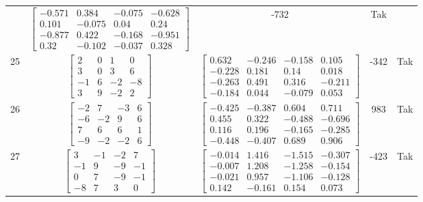 \documentclass[a4paper,12pt]{article}
\begin{document}
\begin{tabular}{c c c c c}
&
$\begin{bmatrix} -0.571 & 0.384 & -0.075 & -0.628 \\ 0.101 & -0.075 & 0.04 & 0.24 \\ -0.877 & 0.422 & -0.168 & -0.951 \\ 0.32 & -0.102 & -0.037 & 0.328 \end{bmatrix}$
&
-732
&
Tak
\\
25
&
$\begin{bmatrix} 2 & 0 & 1 & 0 \\ 3 & 0 & 3 & 6 \\ -1 & 6 & -2 & -8 \\ 3 & 9 & -2 & 2 \end{bmatrix}$
&
$\begin{bmatrix} 0.632 & -0.246 & -0.158 & 0.105 \\ -0.228 & 0.181 & 0.14 & 0.018 \\ -0.263 & 0.491 & 0.316 & -0.211 \\ -0.184 & 0.044 & -0.079 & 0.053 \end{bmatrix}$
&
-342
&
Tak
\\
26
&
$\begin{bmatrix} -2 & 7 & -3 & 6 \\ -6 & -2 & 9 & 6 \\ 7 & 6 & 6 & 1 \\ -9 & -2 & -2 & 6 \end{bmatrix}$
&
$\begin{bmatrix} -0.425 & -0.387 & 0.604 & 0.711 \\ 0.455 & 0.322 & -0.488 & -0.696 \\ 0.116 & 0.196 & -0.165 & -0.285 \\ -0.448 & -0.407 & 0.689 & 0.906 \end{bmatrix}$
&
983
&
Tak
\\
27
&
$\begin{bmatrix} 3 & -1 & -2 & 7 \\ -1 & 9 & -9 & -1 \\ 0 & 7 & -9 & -1 \\ -8 & 7 & 3 & 0 \end{bmatrix}$
&
$\begin{bmatrix} -0.014 & 1.416 & -1.515 & -0.307 \\ -0.007 & 1.208 & -1.258 & -0.154 \\ -0.021 & 0.957 & -1.106 & -0.128 \\ 0.142 & -0.161 & 0.154 & 0.073 \end{bmatrix}$
&
-423
&
Tak
\\

\end{tabular}
\end{document}
